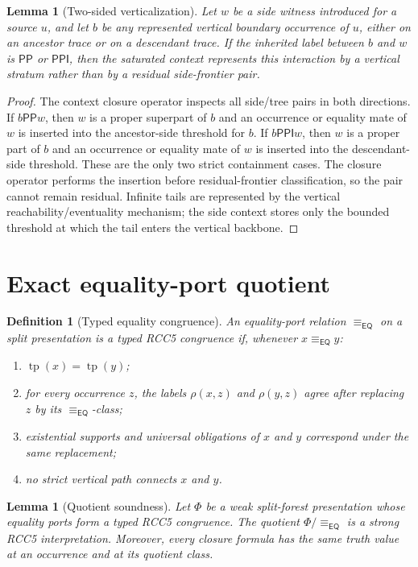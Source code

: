 \documentclass[11pt]{article}
\newtheorem{lemma}[theorem]{Lemma}
\newtheorem{definition}[theorem]{Definition}
\newcommand{\EQ}{\mathsf{EQ}}
\newcommand{\PP}{\mathsf{PP}}
\newcommand{\PPI}{\mathsf{PPI}}
\newcommand{\tp}{\operatorname{tp}}
\newcommand{\eqE}{\equiv_{\EQ}}
\begin{document}
\begin{lemma}[Two-sided verticalization]
Let $w$ be a side witness introduced for a source $u$, and let $b$ be any represented vertical boundary occurrence of $u$, either on an ancestor trace or on a descendant trace.  If the inherited label between $b$ and $w$ is $\PP$ or $\PPI$, then the saturated context represents this interaction by a vertical stratum rather than by a residual side-frontier pair.
\end{lemma}

\begin{proof}
The context closure operator inspects all side/tree pairs in both directions.  If $b\PP w$, then $w$ is a proper superpart of $b$ and an occurrence or equality mate of $w$ is inserted into the ancestor-side threshold for $b$.  If $b\PPI w$, then $w$ is a proper part of $b$ and an occurrence or equality mate of $w$ is inserted into the descendant-side threshold.  These are the only two strict containment cases.  The closure operator performs the insertion before residual-frontier classification, so the pair cannot remain residual.  Infinite tails are represented by the vertical reachability/eventuality mechanism; the side context stores only the bounded threshold at which the tail enters the vertical backbone.
\end{proof}

\section{Exact equality-port quotient}

\begin{definition}[Typed equality congruence]
An equality-port relation $\eqE$ on a split presentation is a typed RCC5 congruence if, whenever $x\eqE y$:
\begin{enumerate}[label=(E\arabic*)]
\item $\tp(x)=\tp(y)$;
\item for every occurrence $z$, the labels $\rho(x,z)$ and $\rho(y,z)$ agree after replacing $z$ by its $\eqE$-class;
\item existential supports and universal obligations of $x$ and $y$ correspond under the same replacement;
\item no strict vertical path connects $x$ and $y$.
\end{enumerate}
\end{definition}

\begin{lemma}[Quotient soundness]
Let $\Phi$ be a weak split-forest presentation whose equality ports form a typed RCC5 congruence.  The quotient $\Phi/{\eqE}$ is a strong RCC5 interpretation.  Moreover, every closure formula has the same truth value at an occurrence and at its quotient class.
\end{lemma}
\end{document}
